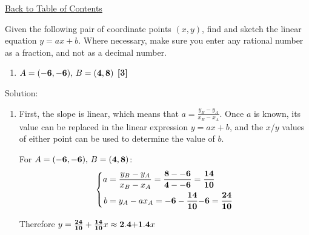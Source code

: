 \documentclass[a4paper, leqno, 12pt]{report}
\newenvironment{top_enumerate}{
\begin{enumerate}
  \setlength{\itemsep}{2em}
  \setlength{\topsep}{-0pt}
  \setlength{\partopsep}{-0pt}
}{\end{enumerate}}
\begin{document}
\hyperlink{contents}{Back to Table of Contents}
\begin{top_enumerate}
\item Given the following pair of coordinate points $(x,y)$, find and sketch the linear equation $y = ax + b$. Where necessary, make sure you enter any rational number as a fraction, and not as a decimal number.
 
\setcounter{equation}{0}  %
\begin{enumerate}
	\setlength{\topsep}{-0pt}
	\setlength{\partopsep}{-0pt}
	\setlength{\itemsep}{10pt}
			\item $A= ({\bf -6},{\bf -6}),\, B= ({\bf 4},{\bf 8})$
	 \quad \textbf{[3]}
\end{enumerate}\addtocounter{enumi}{-1}
\item Solution:
 
\setcounter{equation}{0}  %
\begin{enumerate}
	\setlength{\topsep}{-0pt}
	\setlength{\partopsep}{-0pt}
	\setlength{\itemsep}{10pt}
			\item First, the slope is linear, which means that $a = \frac{y_B-y_A}{x_B-x_A}$. Once $a$ is known, its value can be replaced in the linear expression $y = ax + b$, and the $x$/$y$ values of either point can be used to determine the value of $b$.
	
	For $A= ({\bf -6},{\bf -6}),\, B= ({\bf 4},{\bf 8})$:
	\[
	\left\{\begin{aligned}
	a & = \frac{y_B-y_A}{x_B-x_A} = \frac{{\bf 8}-{\bf -6}}{{\bf 4}-{\bf -6}} = \frac{{\bf 14}}{{\bf 10}}\\
	b & = y_A -ax_A = {\bf -6} - \frac{{\bf 14}}{{\bf 10}}{\bf -6} = \frac{{\bf 24}}{{\bf 10}} \\
	 \end{aligned}\right.
	\]
	
	Therefore $y = \frac{{\bf 24}}{{\bf 10}} + \frac{{\bf 14}}{{\bf 10}}x \approx {\bf 2.4} {\bf  + } {\bf 1.4}x$
	
	\begin{center}
	\end{center}
	 \quad \textbf{}
\end{enumerate}\newpage
\end{top_enumerate}
\end{document}
